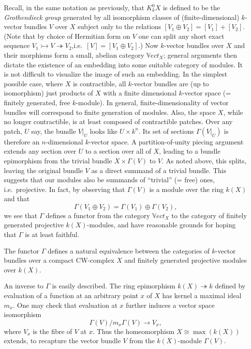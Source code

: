 Recall, in the same notation as previously, that $K_k^0X$ is defined to be the {\em Grothendieck group} generated by all isomorphism classes of (finite-dimensional) $k$-vector bundles $V$ over $X$ subject only to the relations $[V_1\oplus V_2]=[V_1]+[V_2]$. (Note that by choice of Hermitian form on $V$ one can split any short exact sequence $V_1 \rightarrowtail V \twoheadrightarrow V_2$,i.e.\  $[V]=[V_1 \oplus V_2]$.) Now $k$-vector bundles over $X$ and their morphisms form a small, abelian category $\mathbb{V}ect_X$; general arguments then dictate the existence of an embedding into some suitable category of modules. It is not difficult to visualize the image of such an embedding. In the simplest possible case, where $X$ is contractible, all $k$-vector bundles are (up to isomorphism) just products of $X$ with a finite dimensional $k$-vector space (= finitely generated, free $k$-module). In general, finite-dimensionality of vector bundles will correspond to finite generation of modules. Also, the space $X$, while no longer contractible, is at least composed of contractible patches. Over any patch, $U$ say, the bundle $V|_U$ looks like $U\times k^n$. Its set of sections $\Gamma(V|_U)$ is therefore an $n$-dimensional $k$-vector space. A partition-of-unity piecing argument extends any section over $U$ to a section over all of $X$, leading to a bundle epimorphism from the trivial bundle $X\times \Gamma(V)$ to $V$. As noted above, this splits, leaving the original bundle $V$ as a direct summand of a trivial bundle. This suggests that our modules also be summands of ``trivial'' (= free) ones, i.e.\  projective. In fact, by observing that $\Gamma(V)$ is a module over the ring $k(X)$ and that
$$\Gamma(V_1\oplus V_2)=\Gamma(V_1)\oplus \Gamma(V_2),$$
we see that $\Gamma$ defines a functor from the category $\mathbb{V}ect_X$ to the category of finitely generated projective $k(X)$-modules, and have reasonable grounds for hoping that $\Gamma$ is at least faithful.
\begin{theorem}
The functor $\Gamma$ defines a natural equivalence between the categories of $k$-vector bundles over a compact CW-complex $X$ and finitely generated projective modules over $k(X)$.
\end{theorem}

An inverse to $\Gamma$ is easily described. The ring epimorphism $k(X)\twoheadrightarrow k$ defined by evaluation of a function at an arbitrary point $x$ of $X$ has kernel a maximal ideal $m_x$. One may check that evaluation at $x$ further induces a vector space isomorphism
$$\Gamma(V)/m_x\Gamma(V)\longrightarrow V_x,$$
where $V_x$ is the fibre of $V$ at $x$. Thus the homeomorphism $X\cong \max(k(X))$ extends, to recapture the vector bundle $V$ from the $k(X)$-module $\Gamma(V)$.

